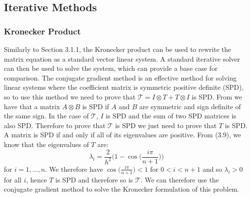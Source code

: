 \documentclass[11pt]{article}
\numberwithin{equation}{section}
\begin{document}
\subsection{Iterative Methods}

\subsubsection{Kronecker Product}
Similarly to Section 3.1.1, the Kronecker product can be used to rewrite the matrix equation as a standard vector linear system. A standard iterative solver can then be used to solve the system, which can provide a base case for comparison. The conjugate gradient method is an effective method for solving linear systems where the coefficient matrix is symmetric positive definite (SPD), so to use this method we need to prove that $\mathcal{T} = I \otimes T + T \otimes I$ is SPD. From \cite{Brewer} we have that a matrix $A \otimes B$ is SPD if $A$ and $B$ are symmetric and sign definite of the same sign. In the case of $\mathcal{T}$, $I$ is SPD and the sum of two SPD matrices is also SPD. Therefore to prove that $\mathcal{T}$ is SPD we just need to prove that $T$ is SPD. A matrix is SPD if and only if all of its eigenvalues are positive. From (3.9), we know that the eigenvalues of $T$ are: 
\[ \lambda_i = \frac{2}{h^2} \Big( 1 - \cos \Big( \frac{i \pi}{n+1} \Big) \Big) \]
for $i=1, \dots, n$. We therefore have $\cos \Big( \frac{i \pi}{n+1} \Big) < 1$ for $0<i<n+1$ and so $\lambda_i > 0$ for all $i$, hence $T$ is SPD and therefore so is $\mathcal{T}$. We can therefore use the conjugate gradient method to solve the Kronecker formulation of this problem. 
\end{document}
